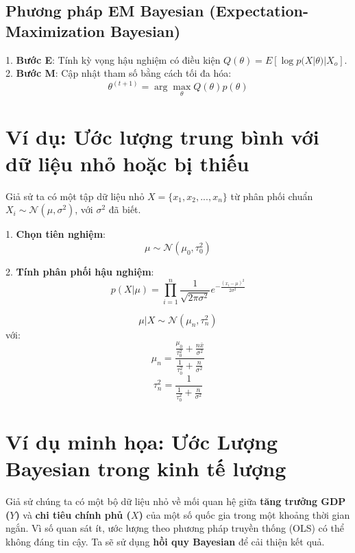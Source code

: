 \subsection{Phương pháp EM Bayesian (Expectation-Maximization Bayesian)}
1. \textbf{Bước E}: Tính kỳ vọng hậu nghiệm có điều kiện $Q(\theta) = E[\log p(X | \theta) | X_o]$.\\
2. \textbf{Bước M}: Cập nhật tham số bằng cách tối đa hóa:
   \begin{equation}
       \theta^{(t+1)} = \arg\max_{\theta} Q(\theta) p(\theta)
   \end{equation}

\section{Ví dụ: Ước lượng trung bình với dữ liệu nhỏ hoặc bị thiếu}
Giả sử ta có một tập dữ liệu nhỏ $X = \{ x_1, x_2, ..., x_n \}$ từ phân phối chuẩn $X_i \sim \mathcal{N}(\mu, \sigma^2)$, với $\sigma^2$ đã biết.

1. \textbf{Chọn tiên nghiệm}:
   \begin{equation}
       \mu \sim \mathcal{N}(\mu_0, \tau_0^2)
   \end{equation}

2. \textbf{Tính phân phối hậu nghiệm}:
   \begin{equation}
       p(X | \mu) = \prod_{i=1}^{n} \frac{1}{\sqrt{2\pi\sigma^2}} e^{-\frac{(x_i - \mu)^2}{2\sigma^2}}
   \end{equation}

   \begin{equation}
       \mu | X \sim \mathcal{N}(\mu_n, \tau_n^2)
   \end{equation}
   với:
   \begin{equation}
       \mu_n = \frac{\frac{\mu_0}{\tau_0^2} + \frac{n\bar{x}}{\sigma^2}}{\frac{1}{\tau_0^2} + \frac{n}{\sigma^2}}
   \end{equation}
   \begin{equation}
       \tau_n^2 = \frac{1}{\frac{1}{\tau_0^2} + \frac{n}{\sigma^2}}
   \end{equation}

   \section{Ví dụ minh họa: Ước Lượng Bayesian trong kinh tế lượng}

   Giả sử chúng ta có một bộ dữ liệu nhỏ về mối quan hệ giữa \textbf{tăng trưởng GDP ($Y$)} và \textbf{chi tiêu chính phủ ($X$)} của một số quốc gia trong một khoảng thời gian ngắn. Vì số quan sát ít, ước lượng theo phương pháp truyền thống (OLS) có thể không đáng tin cậy. Ta sẽ sử dụng \textbf{hồi quy Bayesian} để cải thiện kết quả.
   
